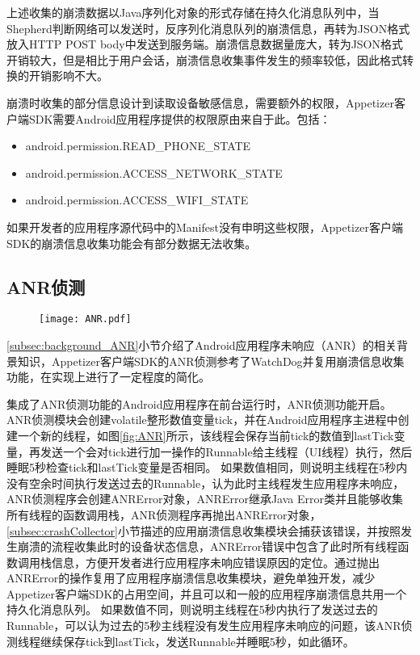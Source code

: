  上述收集的崩溃数据以Java序列化对象的形式存储在持久化消息队列中，当Shepherd判断网络可以发送时，反序列化消息队列的崩溃信息，再转为JSON格式放入HTTP POST body中发送到服务端。崩溃信息数据量庞大，转为JSON格式开销较大，但是相比于用户会话，崩溃信息收集事件发生的频率较低，因此格式转换的开销影响不大。
 
 崩溃时收集的部分信息设计到读取设备敏感信息，需要额外的权限，Appetizer客户端SDK需要Android应用程序提供的权限原由来自于此。包括：
 
\begin{itemize}
 	\item android.permission.READ\_PHONE\_STATE
 	\item android.permission.ACCESS\_NETWORK\_STATE
 	\item android.permission.ACCESS\_WIFI\_STATE
\end{itemize}

如果开发者的应用程序源代码中的Manifest没有申明这些权限，Appetizer客户端SDK的崩溃信息收集功能会有部分数据无法收集。

\subsection{ANR侦测}
\label{subsec:ANRCollector}


\begin{figure}[!htp]
	\centering
	\texttt{[image: ANR.pdf]}
\end{figure}

\ref{subsec:background_ANR}小节介绍了Android应用程序未响应（ANR）的相关背景知识，Appetizer客户端SDK的ANR侦测参考了WatchDog并复用崩溃信息收集功能，在实现上进行了一定程度的简化。

集成了ANR侦测功能的Android应用程序在前台运行时，ANR侦测功能开启。ANR侦测模块会创建volatile整形数值变量tick，并在Android应用程序主进程中创建一个新的线程，如图\ref{fig:ANR}所示，该线程会保存当前tick的数值到lastTick变量，再发送一个会对tick进行加一操作的Runnable给主线程（UI线程）执行，然后睡眠5秒检查tick和lastTick变量是否相同。
如果数值相同，则说明主线程在5秒内没有空余时间执行发送过去的Runnable，认为此时主线程发生应用程序未响应，ANR侦测程序会创建ANRError对象，ANRError继承Java Error类并且能够收集所有线程的函数调用栈，ANR侦测程序再抛出ANRError对象，\ref{subsec:crashCollector}小节描述的应用崩溃信息收集模块会捕获该错误，并按照发生崩溃的流程收集此时的设备状态信息，ANRError错误中包含了此时所有线程函数调用栈信息，方便开发者进行应用程序未响应错误原因的定位。通过抛出ANRError的操作复用了应用程序崩溃信息收集模块，避免单独开发，减少Appetizer客户端SDK的占用空间，并且可以和一般的应用程序崩溃信息共用一个持久化消息队列。
如果数值不同，则说明主线程在5秒内执行了发送过去的Runnable，可以认为过去的5秒主线程没有发生应用程序未响应的问题，该ANR侦测线程继续保存tick到lastTick，发送Runnable并睡眠5秒，如此循环。

